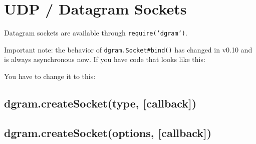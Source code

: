 \section{UDP / Datagram Sockets}\label{udp-datagram-sockets}

\begin{Shaded}
\begin{Highlighting}[]
 
\end{Highlighting}
\end{Shaded}

Datagram sockets are available through \texttt{require('dgram')}.

Important note: the behavior of \texttt{dgram.Socket\#bind()} has
changed in v0.10 and is always asynchronous now. If you have code that
looks like this:

\begin{Shaded}
\begin{Highlighting}[]
 \NormalTok{(}\NormalTok{);}
\NormalTok{(}\NormalTok{);}
\NormalTok{(}\NormalTok{);}
\end{Highlighting}
\end{Shaded}

You have to change it to this:

\begin{Shaded}
\begin{Highlighting}[]
 \NormalTok{(}\NormalTok{);}
\NormalTok{(}\NormalTok{, }\NormalTok{() \{}
  \NormalTok{(}\NormalTok{);}
\NormalTok{\});}
\end{Highlighting}
\end{Shaded}

\subsection{dgram.createSocket(type,
{[}callback{]})}\label{dgram.createsockettype-callback}

\subsection{dgram.createSocket(options,
{[}callback{]})}\label{dgram.createsocketoptions-callback}

